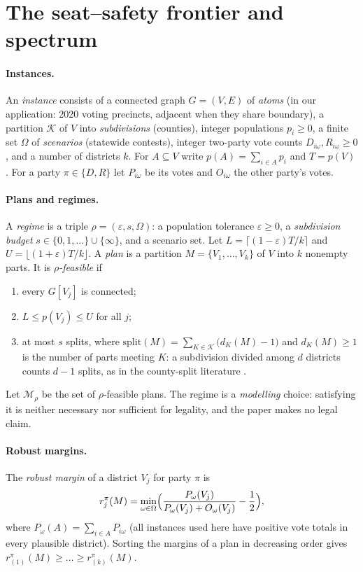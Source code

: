 \section{The seat--safety frontier and spectrum}\label{sec:frontier}

\paragraph{Instances.}
An \emph{instance} consists of a connected graph $G=(V,E)$ of \emph{atoms} (in our application: 2020 voting precincts, adjacent when they share boundary), a partition $\mathcal K$ of $V$ into \emph{subdivisions} (counties), integer populations $p_i\ge 0$, a finite set $\Omega$ of \emph{scenarios} (statewide contests), integer two-party vote counts $D_{i\omega},R_{i\omega}\ge 0$, and a number of districts $k$. For $A\subseteq V$ write $p(A)=\sum_{i\in A}p_i$ and $T=p(V)$. For a party $\pi\in\{D,R\}$ let $P_{i\omega}$ be its votes and $O_{i\omega}$ the other party's votes.

\paragraph{Plans and regimes.}
A \emph{regime} is a triple $\rho=(\varepsilon,s,\Omega)$: a population tolerance $\varepsilon\ge0$, a \emph{subdivision budget} $s\in\{0,1,\dots\}\cup\{\infty\}$, and a scenario set. Let $L=\lceil(1-\varepsilon)T/k\rceil$ and $U=\lfloor(1+\varepsilon)T/k\rfloor$. A \emph{plan} is a partition $M=\{V_1,\dots,V_k\}$ of $V$ into $k$ nonempty parts. It is \emph{$\rho$-feasible} if
\begin{enumerate}
\item[(a)] every $G[V_j]$ is connected;
\item[(b)] $L\le p(V_j)\le U$ for all $j$;
\item[(c)] at most $s$ splits, where $\mathrm{split}(M)=\sum_{K\in\mathcal K}\bigl(d_K(M)-1\bigr)$ and $d_K(M)\ge1$ is the number of parts meeting $K$: a subdivision divided among $d$ districts counts $d-1$ splits, as in the county-split literature \citep{shahmizad2025}.
\end{enumerate}
Let $\mathcal M_\rho$ be the set of $\rho$-feasible plans. The regime is a \emph{modelling} choice: satisfying it is neither necessary nor sufficient for legality, and the paper makes no legal claim.

\paragraph{Robust margins.}
The \emph{robust margin} of a district $V_j$ for party $\pi$ is
\[
r^\pi_j(M)=\min_{\omega\in\Omega}\Bigl(\frac{P_\omega(V_j)}{P_\omega(V_j)+O_\omega(V_j)}-\frac12\Bigr),
\]
where $P_\omega(A)=\sum_{i\in A}P_{i\omega}$ (all instances used here have positive vote totals in every plausible district). Sorting the margins of a plan in decreasing order gives $r^\pi_{(1)}(M)\ge\dots\ge r^\pi_{(k)}(M)$.

